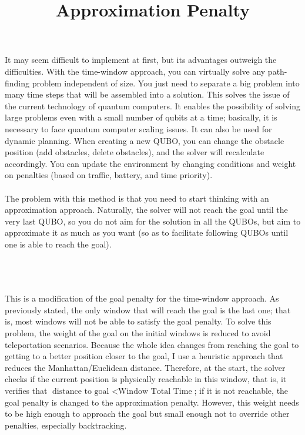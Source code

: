 \documentclass[11pt]{article}
\begin{document}
It may seem difficult to implement at first, but its advantages outweigh the difficulties. With the time-window approach, you can virtually solve any path-finding problem independent of size. You just need to separate a big problem into many time steps that will be assembled into a solution. This solves the issue of the current technology of quantum computers. It enables the possibility of solving large problems even with a small number of qubits at a time; basically, it is necessary to face quantum computer scaling issues. It can also be used for dynamic planning. When creating a new QUBO, you can change the obstacle position (add obstacles, delete obstacles), and the solver will recalculate accordingly. You can update the environment by changing conditions and weight on penalties (based on traffic, battery, and time priority).\\
\\
The problem with this method is that you need to start thinking with an approximation approach. Naturally, the solver will not reach the goal until the very last QUBO, so you do not aim for the solution in all the QUBOs, but aim to approximate it as much as you want (so as to facilitate following QUBOs until one is able to reach the goal).\\
\\
\title{\textbf{Approximation Penalty}}\\
\\
This is a modification of the goal penalty for the time-window approach. As previously stated, the only window that will reach the goal is the last one; that is, most windows will not be able to satisfy the goal penalty. To solve this problem, the weight of the goal on the initial windows is reduced to avoid teleportation scenarios. Because the whole idea changes from reaching the goal to getting to a better position closer to the goal, I use a heuristic approach that reduces the Manhattan/Euclidean distance. Therefore, at the start, the solver checks if the current position is physically reachable in this window, that is, it verifies that \(\text{distance to goal } < \text{Window Total Time}\); if it is not reachable, the goal penalty is changed to the approximation penalty. However,  this weight needs to be high enough to approach the goal but small enough not to override other penalties, especially backtracking.\\
\\
\end{document}
